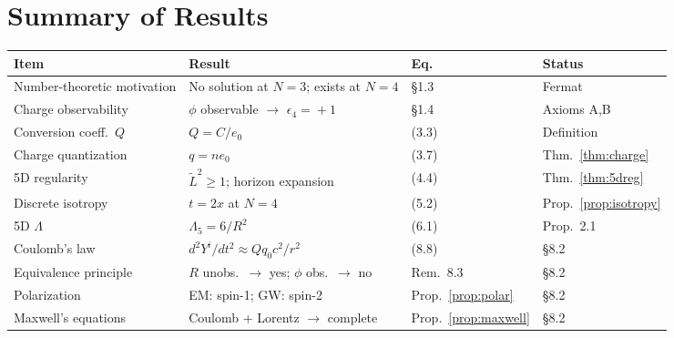 \documentclass[12pt,a4paper]{article}
\begin{document}
\section*{Summary of Results}

\begin{center}
\begin{tabular}{llll}
\toprule
Item & Result & Eq. & Status \\
\midrule
Number-theoretic motivation & No solution at $N\!=\!3$; exists at $N\!=\!4$ & \S1.3 & Fermat~\cite{Kihara2026b} \\
Charge observability & $\phi$ observable $\to$ $\epsilon_4\!=\!+1$ & \S1.4 & Axioms A,B \\
Conversion coeff.\ $Q$ & $Q = C/e_0$ & (3.3) & Definition \\
Charge quantization & $q = ne_0$ & (3.7) & Thm.~\ref{thm:charge} \\
5D regularity & $\tilde{L}^2 \geq 1$; horizon expansion & (4.4) & Thm.~\ref{thm:5dreg} \\
Discrete isotropy & $t = 2x$ at $N\!=\!4$ & (5.2) & Prop.~\ref{prop:isotropy} \\
5D $\Lambda$ & $\Lambda_5 = 6/R^2$ & (6.1) & Prop.~2.1 \\
Coulomb's law & $d^2Y^i/dt^2 \approx Qq_0 c^2/r^2$ & (8.8) & \S8.2 \\
Equivalence principle & $R$ unobs.\ $\to$ yes; $\phi$ obs.\ $\to$ no & Rem.~8.3 & \S8.2 \\
Polarization & EM: spin-1; GW: spin-2 & Prop.~\ref{prop:polar} & \S8.2 \\
Maxwell's equations & Coulomb + Lorentz $\to$ complete & Prop.~\ref{prop:maxwell} & \S8.2 \\
\bottomrule
\end{tabular}
\end{center}
\end{document}

